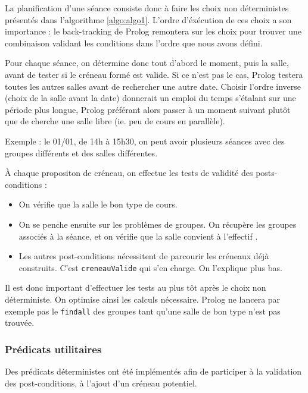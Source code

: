 La planification d'une séance consiste donc à faire les choix non déterministes
présentés dans l'algorithme \ref{algo:algo1}. L'ordre d'éxécution de ces choix
a son importance : le back-tracking de Prolog remontera sur les choix pour
trouver une combinaison validant les conditions dans l'ordre que nous avons
défini.

Pour chaque séance, on détermine donc tout d'abord le moment, puis la salle,
avant de tester si le créneau formé est valide. Si ce n'est pas le cas, Prolog
testera toutes les autres salles avant de rechercher une autre date.
Choisir l'ordre inverse (choix de la salle avant la date) donnerait un emploi du
temps s'étalant sur une période plus longue, Prolog préférant alors passer à un
moment suivant plutôt que de cherche une salle libre (ie. peu de cours en
parallèle).

Exemple : le 01/01, de 14h à 15h30, on peut avoir plusieurs séances avec des
groupes différents et des salles différentes.

À chaque propositon de créneau, on effectue les tests de validité des
posts-conditions :

\begin{itemize}

    \item On vérifie que la salle le bon type de cours.

    \item On se penche ensuite sur les problèmes de groupes. On récupère les
        groupes associés à la séance, et on vérifie que la salle convient à
        l'effectif .

    \item Les autres post-conditions nécessitent de parcourir les créneaux déjà
        construits. C'est \texttt{creneauValide} qui s'en charge. On l'explique
        plus bas.

\end{itemize}

Il est donc important d'effectuer les tests au plus tôt après le choix non
déterministe. On optimise ainsi les calculs nécessaire. Prolog ne lancera par
exemple pas le \texttt{findall} des groupes tant qu'une salle de bon type n'est
pas trouvée.

\subsubsection{Prédicats utilitaires}

Des prédicats déterministes ont été implémentés afin de participer à la
validation des post-conditions, à l'ajout d'un créneau potentiel.

